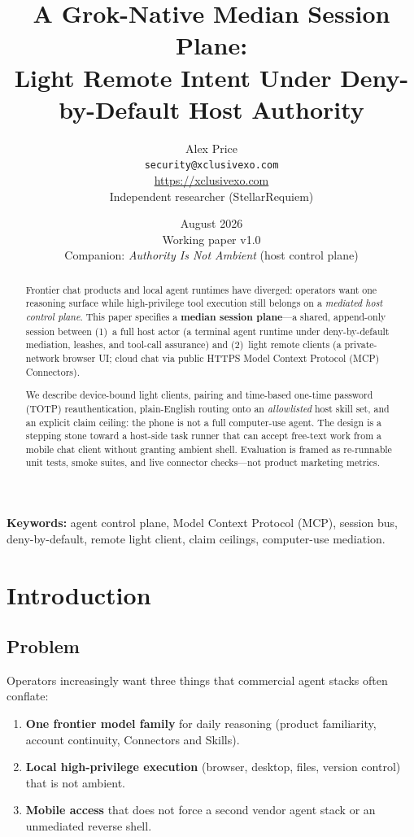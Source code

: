 \documentclass[11pt,a4paper]{article}
\title{A Grok-Native Median Session Plane:\\
Light Remote Intent Under Deny-by-Default Host Authority}
\author{Alex Price\\
\texttt{security@xclusivexo.com}\\
\url{https://xclusivexo.com}\\
Independent researcher (StellarRequiem)}
\date{August 2026\\
Working paper v1.0\\
Companion: \emph{Authority Is Not Ambient} (host control plane)}
\begin{document}
\maketitle

\begin{abstract}
Frontier chat products and local agent runtimes have diverged: operators want one
reasoning surface while high-privilege tool execution still belongs on a
\emph{mediated host control plane}. This paper specifies a \textbf{median session
plane}---a shared, append-only session between (1)~a full host actor (a terminal
agent runtime under deny-by-default mediation, leashes, and tool-call assurance)
and (2)~light remote clients (a private-network browser UI; cloud chat via public
HTTPS Model Context Protocol (MCP) Connectors).

We describe device-bound light clients, pairing and time-based one-time password
(TOTP) reauthentication, plain-English routing onto an \emph{allowlisted} host
skill set, and an explicit claim ceiling: the phone is not a full computer-use
agent. The design is a stepping stone toward a host-side task runner that can
accept free-text work from a mobile chat client without granting ambient shell.
Evaluation is framed as re-runnable unit tests, smoke suites, and live connector
checks---not product marketing metrics.
\end{abstract}

\noindent\textbf{Keywords:}
agent control plane, Model Context Protocol (MCP), session bus,
deny-by-default, remote light client, claim ceilings, computer-use mediation.

\section{Introduction}

\subsection{Problem}

Operators increasingly want three things that commercial agent stacks often
conflate:

\begin{enumerate}[leftmargin=*]
  \item \textbf{One frontier model family} for daily reasoning (product
        familiarity, account continuity, Connectors and Skills).
  \item \textbf{Local high-privilege execution} (browser, desktop, files, version
        control) that is not ambient.
  \item \textbf{Mobile access} that does not force a second vendor agent stack or
        an unmediated reverse shell.
\end{enumerate}
\end{document}
